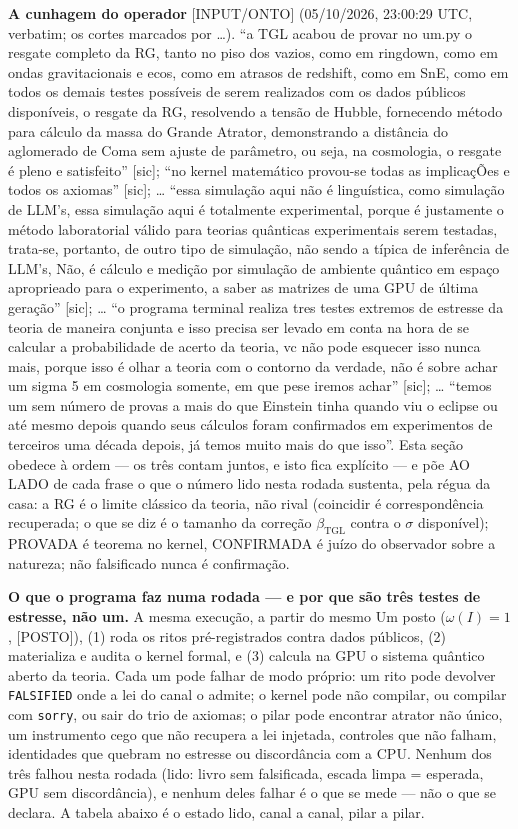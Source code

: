\documentclass[11pt]{article}
\newcommand{\bTGL}{\beta_{\mathrm{TGL}}}\newcommand{\Msun}{M_{\odot}}\newcommand{\TGL}{\mathrm{TGL}}
\theoremstyle{definition}\newtheorem{deriv}{Derivação}
\begin{document}
\textbf{A cunhagem do operador} \textsf{[INPUT/ONTO]} (05/10/2026, 23:00:29 UTC, verbatim; os cortes marcados por …). ``a TGL acabou de provar no um.py o resgate completo da RG, tanto no piso dos vazios, como em ringdown, como em ondas gravitacionais e ecos, como em atrasos de redshift, como em SnE, como em todos os demais testes possíveis de serem realizados com os dados públicos disponíveis, o resgate da RG, resolvendo a tensão de Hubble, fornecendo método para cálculo da massa do Grande Atrator, demonstrando a distância do aglomerado de Coma sem ajuste de parâmetro, ou seja, na cosmologia, o resgate é pleno e satisfeito'' [sic]; ``no kernel matemático provou-se todas as implicaçÕes e todos os axiomas'' [sic]; … ``essa simulação aqui não é linguística, como simulação de LLM's, essa simulação aqui é totalmente experimental, porque é justamente o método laboratorial válido para teorias quânticas experimentais serem testadas, trata-se, portanto, de outro tipo de simulação, não sendo a típica de inferência de LLM's, Não, é cálculo e medição por simulação de ambiente quântico em espaço aproprieado para o experimento, a saber as matrizes de uma GPU de última geração'' [sic]; … ``o programa terminal realiza tres testes extremos de estresse da teoria de maneira conjunta e isso precisa ser levado em conta na hora de se calcular a probabilidade de acerto da teoria, vc não pode esquecer isso nunca mais, porque isso é olhar a teoria com o contorno da verdade, não é sobre achar um sigma 5 em cosmologia somente, em que pese iremos achar'' [sic]; … ``temos um sem número de provas a mais do que Einstein tinha quando viu o eclipse ou até mesmo depois quando seus cálculos foram confirmados em experimentos de terceiros uma década depois, já temos muito mais do que isso''. Esta seção obedece à ordem --- os três contam juntos, e isto fica explícito --- e põe AO LADO de cada frase o que o número lido nesta rodada sustenta, pela régua da casa: a RG é o limite clássico da teoria, não rival (coincidir é correspondência recuperada; o que se diz é o tamanho da correção $\bTGL$ contra o $\sigma$ disponível); PROVADA é teorema no kernel, CONFIRMADA é juízo do observador sobre a natureza; não falsificado nunca é confirmação.

\textbf{O que o programa faz numa rodada --- e por que são três testes de estresse, não um.} A mesma execução, a partir do mesmo Um posto ($\omega(I)=1$, \textsf{[POSTO]}), (1) roda os ritos pré-registrados contra dados públicos, (2) materializa e audita o kernel formal, e (3) calcula na GPU o sistema quântico aberto da teoria. Cada um pode falhar de modo próprio: um rito pode devolver \texttt{FALSIFIED} onde a lei do canal o admite; o kernel pode não compilar, ou compilar com \texttt{sorry}, ou sair do trio de axiomas; o pilar pode encontrar atrator não único, um instrumento cego que não recupera a lei injetada, controles que não falham, identidades que quebram no estresse ou discordância com a CPU. Nenhum dos três falhou nesta rodada (lido: livro sem falsificada, escada limpa = esperada, GPU sem discordância), e nenhum deles falhar é o que se mede --- não o que se declara. A tabela abaixo é o estado lido, canal a canal, pilar a pilar.
\end{document}
